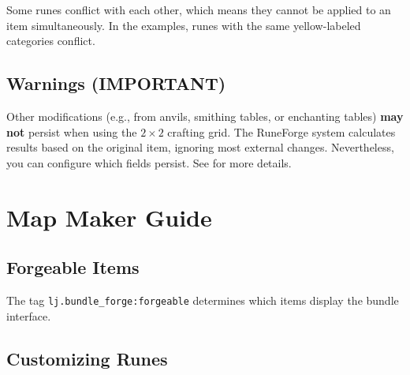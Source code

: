 \documentclass[11pt]{article}
\begin{document}
Some runes conflict with each other, which means they cannot be applied to an item simultaneously. In the examples, runes with the same yellow-labeled categories conflict.

\subsection{Warnings (IMPORTANT)}

Other modifications (e.g., from anvils, smithing tables, or enchanting tables) \textbf{may not} persist when using the $2 \times 2$ crafting grid. The RuneForge system calculates results based on the original item, ignoring most external changes. Nevertheless, you can configure which fields persist. See  for more details.

\section{Map Maker Guide}

\newcommand{\compound}{\textcolor{blue!70}{\faCube}}
\newcommand{\stringicon}{\textcolor{green!60!black}{\faTag}}
\newcommand{\inticon}{\textcolor{red!70}{\faHashtag}}
\newcommand{\listicon}{\textcolor{purple!70}{\faListOl}}
\newcommand{\byteicon}{\textcolor{orange!70}{\faDotCircleO}}
\newcommand{\vertline}{\textSFviii\;}
\newcommand{\nodeend}{\textSFx\textSFx\;}
\newcommand{\nodesplit}{\textSFx\textSFii\;}
\newcommand{\desc}[1]{{\latin #1}}
\newcommand{\key}[1]{{\small\textbf{#1}}}

\subsection{Forgeable Items}

The tag \texttt{\small lj.bundle\_forge:forgeable} determines which items display the bundle interface.

\subsection{Customizing Runes}
\end{document}
